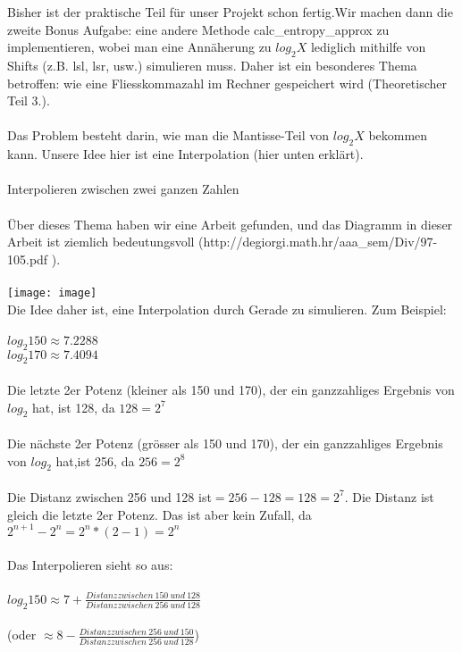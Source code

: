\documentclass[11pt]{article}
\begin{document}
{{{\begin{large}
Bisher ist der praktische Teil f\"ur unser Projekt schon fertig.Wir machen dann die zweite Bonus Aufgabe: eine andere Methode calc\_entropy\_approx zu implementieren, wobei man eine Ann\"aherung zu $log_2{X}$ lediglich mithilfe von Shifts (z.B. lsl, lsr, usw.) simulieren muss. Daher ist ein besonderes Thema betroffen: wie eine Fliesskommazahl im Rechner gespeichert wird (Theoretischer Teil 3.).\\\\
Das Problem besteht darin, wie man die Mantisse-Teil von $log_2{X}$ bekommen kann. Unsere Idee hier ist eine Interpolation ({\color{red}hier unten erkl\"art}). \\\\
{\color{red}Interpolieren zwischen zwei ganzen Zahlen} \\\\
\"Uber dieses Thema haben wir eine Arbeit gefunden, und das Diagramm in dieser Arbeit ist ziemlich bedeutungsvoll (http://degiorgi.math.hr/aaa\_sem/Div/97-105.pdf ). \\\\
\texttt{[image: image]}\\
Die Idee daher ist, eine Interpolation durch Gerade zu simulieren. Zum Beispiel: \\\\
	$log_2{150 } \approx 7.2288$ \\
    $log_2{170} \approx 7.4094$ \\\\
Die letzte 2er Potenz (kleiner als 150 und 170), der ein ganzzahliges Ergebnis von $log_2$ hat, ist 128, da $ 128 = 2^7$ \\\\
Die n\"achste 2er Potenz (gr\"osser als 150 und 170), der ein ganzzahliges Ergebnis von $log_2$  hat,ist 256, da $256 = 2^8$ \\\\
Die Distanz zwischen 256 und 128 ist$ = 256 - 128 = 128 = 2^7$. Die Distanz ist gleich die letzte 2er Potenz. Das ist aber kein Zufall, da $2^{n+1} - 2^n = 2^n*(2 - 1) = 2^n$ \\\\
Das Interpolieren sieht so aus:\\\\
	$ \displaystyle{  log_2{150} \approx 7 + \frac{Distanz zwischen \ 150 \ und \ 128}{Distanz zwischen \ 256 \ und \ 128}} $ \\\\
	(oder $ \displaystyle{ \approx 8 - \frac{Distanz zwischen \ 256 \ und \ 150} {Distanz zwischen \ 256  \ und \ 128}}$) \\\\

\end{large}}}}
\end{document}

